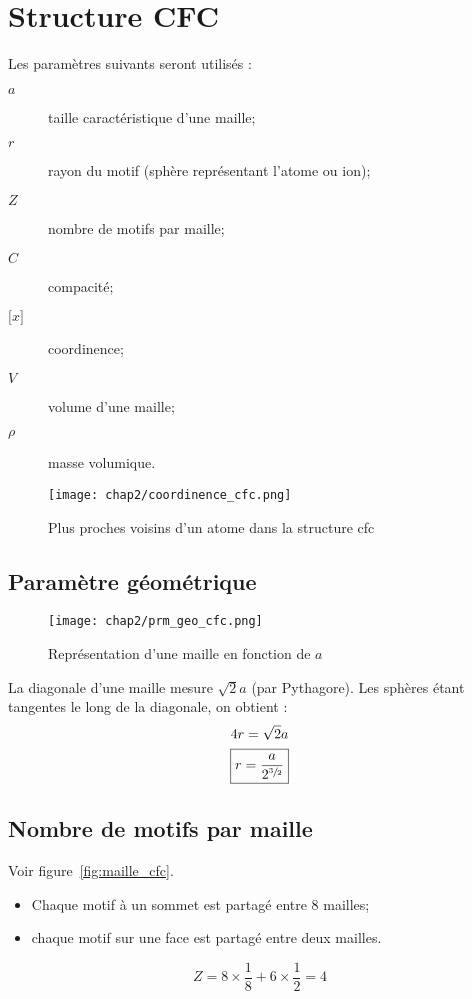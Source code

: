 \section{Structure CFC}
Les paramètres suivants seront utilisés :
\begin{description}
    \item[$a$] taille caractéristique d'une maille;
    \item[$r$] rayon du motif (sphère représentant l'atome ou ion);
    \item[$Z$] nombre de motifs par maille;
    \item[$C$] compacité;
    \item[$\lbrack x \rbrack$] coordinence;
    \item[$V$] volume d'une maille;
    \item[$\rho$] masse volumique.
\end{description}
\begin{figure}
    \centering
    \texttt{[image: chap2/coordinence\_cfc.png]}
    \caption{Plus proches voisins d'un atome dans la
        structure cfc}\label{fig:coordinence_cfc}
\end{figure}
\subsection{Paramètre géométrique}
\begin{figure}
    \centering
    \texttt{[image: chap2/prm\_geo\_cfc.png]}
    \caption{Représentation d'une maille en fonction de $a$}\label{fig:prm_geo_cfc}
\end{figure}

La diagonale d'une maille mesure $\sqrt{2}a$ (par Pythagore).
Les sphères étant tangentes le long de la diagonale, on obtient :
\begin{gather}
    4r = \sqrt{2}a \\
    \boxed{r = \frac{a}{2^{\sfrac{3}{2}}}} \label{eq:r}
\end{gather}
\subsection{Nombre de motifs par maille}
Voir figure~\ref{fig:maille_cfc}.
\begin{itemize}
    \item Chaque motif à un sommet est partagé entre 8 mailles;
    \item chaque motif sur une face est partagé entre deux mailles.
\end{itemize}
\begin{equation}
    Z = 8 \times \frac{1}{8} + 6 \times \frac{1}{2} = 4
\end{equation}
